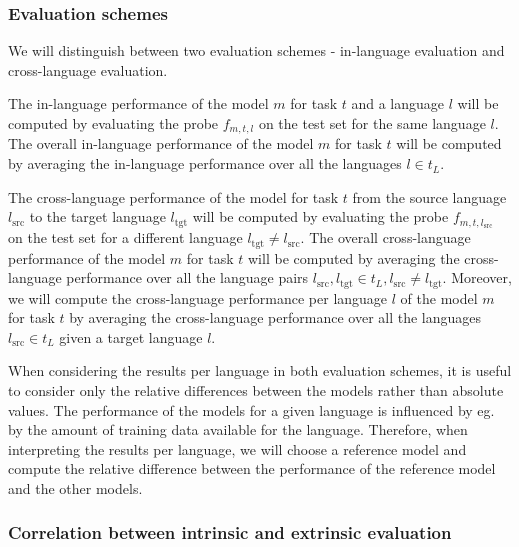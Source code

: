 
\subsubsection{Evaluation schemes}

We will distinguish between two evaluation schemes - in-language evaluation and cross-language  evaluation. 

The in-language performance of the model $m$ for task $t$ and a language $l$ will be computed by evaluating the probe $f_{m, t, l}$ on the test set for the same language $l$. 
The overall in-language performance of the model $m$ for task $t$ will be computed by averaging the in-language performance over all the languages $l \in t_L$. 

The cross-language performance of the model for task $t$ from the source language $l_\mathrm{src}$ to the target language $l_\mathrm{tgt}$ will be computed by evaluating the probe $f_{m, t, l_\mathrm{src}}$ on the test set for a different language $l_\mathrm{tgt} \neq l_\mathrm{src}$. 
The overall cross-language performance of the model $m$ for task $t$ will be computed by averaging the cross-language performance over all the language pairs $l_\mathrm{src}, l_\mathrm{tgt} \in t_L, l_\mathrm{src} \neq l_\mathrm{tgt}$.
Moreover, we will compute the cross-language performance per language $l$ of the model $m$ for task $t$ by averaging the cross-language performance over all the languages $l_\mathrm{src} \in t_L$ given a target language $l$.

When considering the results per language in both evaluation schemes, it is useful to consider only the relative differences between the models rather than absolute values. The performance of the models for a given language is influenced by eg. by the amount of training data available for the language. Therefore, when interpreting the results per language, we will choose a reference model and compute the relative difference between the performance of the reference model and the other models.

\subsubsection{Correlation between intrinsic and extrinsic evaluation}

